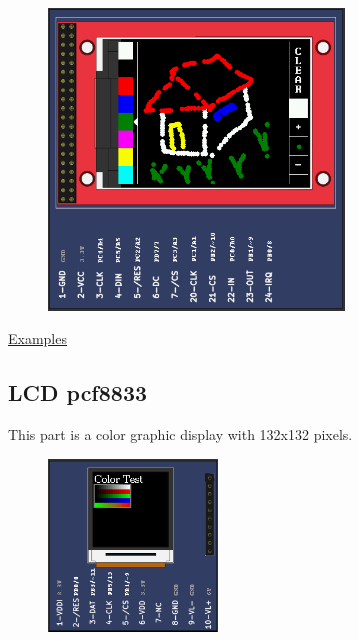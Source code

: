 \begin{figure}[H]
\center
\includegraphics[width=0.7\textwidth]{img/part_lcd_ili9341.png} 
\end{figure} 

\href{https://lcgamboa.github.io/picsimlab_examples/parts_LCD_ili9341.html}{Examples}

\vspace{0.5cm}

\vspace{0.5cm}


\subsection{LCD pcf8833}

This part is a color graphic display with 132x132 pixels.

\begin{figure}[H]
\center
\includegraphics[width=0.4\textwidth]{img/part_pcf8833.png} 
\end{figure} 

